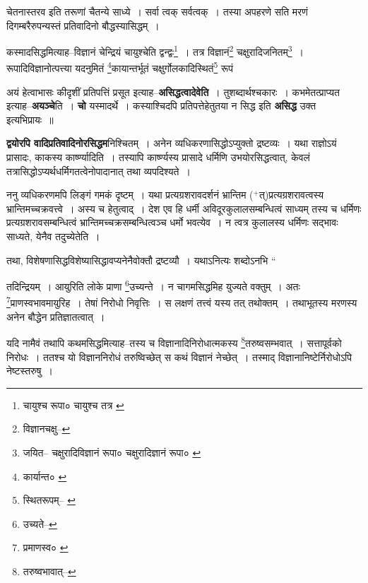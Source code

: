 \documentclass[article,12pt,a4paper]{memoir}
\newcommand{\add}[1]{($^{+}$#1)}
\begin{document}
	  \endgroup
	 

	  \pstart चेतनास्तरव इति तरूणां चैतन्ये साध्ये । सर्वा त्वक् सर्वत्वक् । तस्या अपहरणे सति मरणं दिगम्बरैरुपन्यस्तं प्रतिवादिनो बौद्धस्यासिद्धम् ।
	\pend
       

	  \pstart कस्मादसिद्धमित्याह--विज्ञानं चेन्द्रियं चायुश्चेति द्वन्द्वः\footnote{चायुश्च रूपा० \cite{dp-msA} \cite{dp-edP} \cite{dp-edH} चायुश्च तत्र \cite{dp-msB} \cite{dp-edN}} । तत्र विज्ञानं\footnote{विज्ञानचक्षु--\cite{dp-msB}} चक्षुरादिजनितम्\footnote{जयित--\cite{dp-msB} चक्षुरादिविज्ञानं रूपा० \cite{dp-edE} चक्षुरादिज्ञानं रूपा० \cite{dp-msC}} । रूपादिविज्ञानोत्पत्त्या यदनुमितं \footnote{कार्यान्त० \cite{dp-msB} \cite{dp-edP}}कायान्तर्भूतं चक्षुर्गोलकादिस्थितं\footnote{स्थितरूपम्--\cite{dp-msA} \cite{dp-msB} \cite{dp-edP} \cite{dp-edH} \cite{dp-edN}} रूपं
	\pend
      
	  \endgroup
	

	  \pstart अयं हेत्वाभासः कीदृशीं प्रतिपत्तिं प्रसूत इत्याह--\textbf{असिद्धत्वादेवेति} । तुशब्दार्थश्चकारः । कभमेतत्प्राप्यत इत्याह--\textbf{अयञ्चे}ति । \textbf{चो} यस्मादर्थे । कस्याश्चिदपि प्रतिपत्तेहेतुतया न सिद्ध इति \textbf{असिद्ध} उक्त इत्यभिप्रायः ॥
	\pend
      

	  \pstart \textbf{द्वयोरपि वादिप्रतिवादिनोरसिद्धम}निश्चितम् । अनेन व्यधिकरणासिद्धोऽप्युक्तो द्रष्टव्यः । यथा राज्ञोऽयं प्रासादः, काकस्य कार्ष्ण्यादिति । तस्यापि कार्ष्ण्यस्य प्रासादे धर्मिणि उभयोरसिद्धत्वात्, केवलं तत्रासिद्धोऽप्यर्थधर्मिगतत्वेनोपादानात् तथा व्यपदिश्यते ।
	\pend
      

	  \pstart ननु व्यधिकरणमपि लिङ्गं गमकं दृष्टम् । यथा प्रत्यग्रशरावदर्शनं भ्रान्तिम \add{त्}प्रत्यग्रशरावत्वस्य भ्रान्तिमच्चक्रवत्त्वे । अस्य च हेतुत्वाद् । देश एव हि धर्मी अविदूरकुलालसम्बन्धित्वं साध्यम् तस्य च धर्मिणः प्रत्यग्रशरावसम्बन्धित्वं भ्रान्तिमच्चक्रसम्बन्धित्वञ्च धर्मो भवत्येव । न त्वत्र कुलालस्य धर्मिणः सद्भावः साध्यते, येनैव तदुच्येतेति ।
	\pend
      

	  \pstart तथा, विशेषणासिद्धविशेष्यासिद्धावप्यनेनैवोक्तौ द्रष्टव्यौ । यथाऽनित्यः शब्दोऽनभि \leavevmode{} “
	  
	तदिन्द्रियम् । आयुरिति लोके प्राणा \footnote{उच्यते--\cite{dp-msB}}उच्यन्ते । न चागमसिद्धमिह युज्यते वक्तुम् । अतः \footnote{प्रमाणस्व० \cite{dp-edH}}प्राणस्वभावमायुरिह । तेषां निरोधो निवृत्तिः । स लक्षणं तत्त्वं यस्य तत् तथोक्तम् । तथाभूतस्य मरणस्य अनेन बौद्धेन प्रतिज्ञातत्वात् । 
	  
	यदि नामैवं तथापि कथमसिद्धमित्याह--तस्य च विज्ञानादिनिरोधात्मकस्य \footnote{तरुष्वभावात्--\cite{dp-msB}}तरुष्वसम्भवात् । सत्तापूर्वको निरोधः । ततश्च यो विज्ञाननिरोधं तरुष्विच्छेत् स कथं विज्ञानं नेच्छेत् । तस्माद् विज्ञानानिष्टेर्निरोधोऽपि नेष्टस्तरुषु । 
	  
\end{document}
